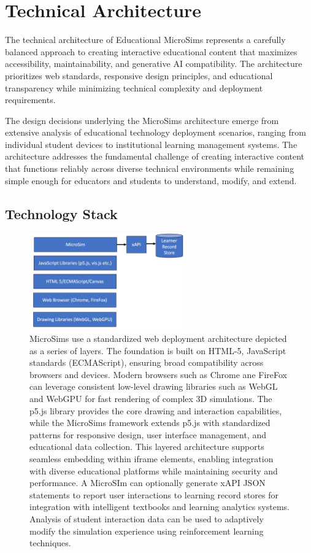 \section{Technical Architecture}
\label{sec:architecture}

The technical architecture of Educational MicroSims represents a carefully balanced approach to creating interactive educational content that maximizes accessibility, maintainability, and generative AI compatibility. The architecture prioritizes web standards, responsive design principles, and educational transparency while minimizing technical complexity and deployment requirements.

The design decisions underlying the MicroSims architecture emerge from extensive analysis of educational technology deployment scenarios, ranging from individual student devices to institutional learning management systems. The architecture addresses the fundamental challenge of creating interactive content that functions reliably across diverse technical environments while remaining simple enough for educators and students to understand, modify, and extend.

\subsection{Technology Stack}

\begin{figure}[htbp]
\centering
\includegraphics[width=0.6\textwidth]{figures/microsim-architecture.png}
\caption{MicroSims use a standardized web deployment architecture depicted as a series of layers. The foundation is built on HTML-5, JavaScript standards (ECMAScript), ensuring broad compatibility across browsers and devices. Modern browsers such as Chrome ane FireFox can leverage consistent low-level drawing libraries such as WebGL and WebGPU for fast rendering of complex 3D simulations. The p5.js library provides the core drawing and interaction capabilities, while the MicroSims framework extends p5.js with standardized patterns for responsive design, user interface management, and educational data collection. This layered architecture supports seamless embedding within iframe elements, enabling integration with diverse educational platforms while maintaining security and performance.  A MicroSIm can optionally generate xAPI JSON statements to report user interactions to learning record stores for integration with intelligent textbooks and learning analytics systems.  Analysis of student interaction data can be used to adaptively modify the simulation experience using reinforcement learning techniques.}
\label{fig:architecture}
\end{figure}

